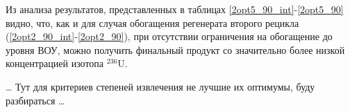Из анализа результатов, представленных в таблицах \ref{2opt5_90_int}-\ref{2opt5_90} видно, что, как и для случая обогащения регенерата второго рецикла (\ref{2opt2_90_int}-\ref{2opt2_90}), при отсутствии ограничения на обогащение до уровня ВОУ, можно получить финальный продукт со значительно более низкой концентрацией изотопа $^{236}$U.

\dots
Тут для критериев степеней извлечения не лучшие их оптимумы, буду разбираться
\dots





